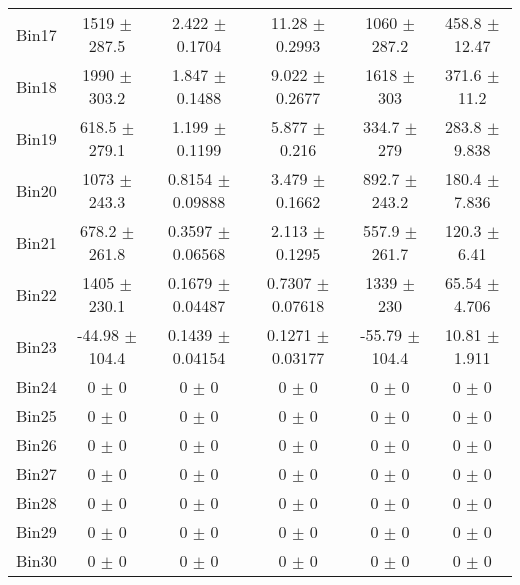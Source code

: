 \begin{tabular}{@{\extracolsep{4pt}}lccccc@{}}
     Bin17 & 1519 $\pm$ 287.5 & 2.422 $\pm$ 0.1704 & 11.28 $\pm$ 0.2993 & 1060 $\pm$ 287.2 & 458.8 $\pm$ 12.47 \\ 
     Bin18 & 1990 $\pm$ 303.2 & 1.847 $\pm$ 0.1488 & 9.022 $\pm$ 0.2677 & 1618 $\pm$ 303 & 371.6 $\pm$ 11.2 \\ 
     Bin19 & 618.5 $\pm$ 279.1 & 1.199 $\pm$ 0.1199 & 5.877 $\pm$ 0.216 & 334.7 $\pm$ 279 & 283.8 $\pm$ 9.838 \\ 
     Bin20 & 1073 $\pm$ 243.3 & 0.8154 $\pm$ 0.09888 & 3.479 $\pm$ 0.1662 & 892.7 $\pm$ 243.2 & 180.4 $\pm$ 7.836 \\ 
     Bin21 & 678.2 $\pm$ 261.8 & 0.3597 $\pm$ 0.06568 & 2.113 $\pm$ 0.1295 & 557.9 $\pm$ 261.7 & 120.3 $\pm$ 6.41 \\ 
     Bin22 & 1405 $\pm$ 230.1 & 0.1679 $\pm$ 0.04487 & 0.7307 $\pm$ 0.07618 & 1339 $\pm$ 230 & 65.54 $\pm$ 4.706 \\ 
     Bin23 & -44.98 $\pm$ 104.4 & 0.1439 $\pm$ 0.04154 & 0.1271 $\pm$ 0.03177 & -55.79 $\pm$ 104.4 & 10.81 $\pm$ 1.911 \\ 
     Bin24 & 0 $\pm$ 0 & 0 $\pm$ 0 & 0 $\pm$ 0 & 0 $\pm$ 0 & 0 $\pm$ 0 \\ 
     Bin25 & 0 $\pm$ 0 & 0 $\pm$ 0 & 0 $\pm$ 0 & 0 $\pm$ 0 & 0 $\pm$ 0 \\ 
     Bin26 & 0 $\pm$ 0 & 0 $\pm$ 0 & 0 $\pm$ 0 & 0 $\pm$ 0 & 0 $\pm$ 0 \\ 
     Bin27 & 0 $\pm$ 0 & 0 $\pm$ 0 & 0 $\pm$ 0 & 0 $\pm$ 0 & 0 $\pm$ 0 \\ 
     Bin28 & 0 $\pm$ 0 & 0 $\pm$ 0 & 0 $\pm$ 0 & 0 $\pm$ 0 & 0 $\pm$ 0 \\ 
     Bin29 & 0 $\pm$ 0 & 0 $\pm$ 0 & 0 $\pm$ 0 & 0 $\pm$ 0 & 0 $\pm$ 0 \\ 
     Bin30 & 0 $\pm$ 0 & 0 $\pm$ 0 & 0 $\pm$ 0 & 0 $\pm$ 0 & 0 $\pm$ 0 \\ 
\hline\hline
  \end{tabular}
